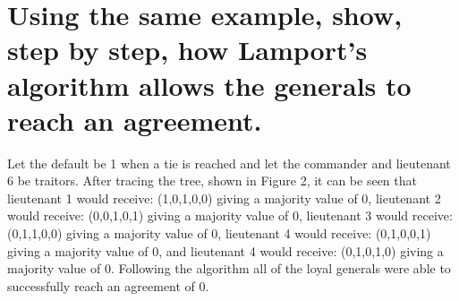 \documentclass[times]{article}
\begin{document}
	\section{Using the same example, show, step by step, how Lamport’s algorithm allows the generals to reach an agreement.}
		Let the default be 1 when a tie is reached and let the commander and lieutenant 6 be traitors. After tracing the tree, shown in Figure 2, it can be seen that lieutenant 1 would receive: (1,0,1,0,0) giving a majority value of 0, lieutenant 2 would receive: (0,0,1,0,1) giving a majority value of 0, lieutenant 3 would receive: (0,1,1,0,0) giving a majority value of 0, lieutenant 4 would receive: (0,1,0,0,1) giving a majority value of 0, and lieutenant 4 would receive: (0,1,0,1,0) giving a majority value of 0. Following the algorithm all of the loyal generals were able to successfully reach an agreement of 0.
		
\end{document}
